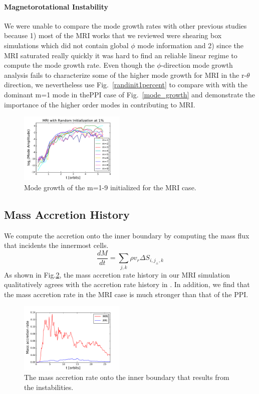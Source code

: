 \documentclass[iop,revtex4]{emulateapj}
\begin{document}
\paragraph*{\rm{\textbf{Magnetorotational Instability}\\}}
We were unable to compare the mode growth rates with other previous studies because 1) most of the \ac{MRI} works that we reviewed were shearing box simulations which did not contain global $\phi$ mode information and 2) since the \ac{MRI} saturated really quickly it was hard to find an reliable linear regime to compute the mode growth rate. Even though the $\phi$-direction mode growth analysis fails to characterize some of the higher mode growth for \ac{MRI} in the r-$\theta$ direction, we nevertheless use Fig.~\ref{randinit1percent} to compare with with the dominant m=1 mode in the\ac{PPI} case of  Fig.~\ref{mode_growth} and demonstrate the importance of the higher order modes in contributing to \ac{MRI}. 
\begin{figure}[ht]
\includegraphics[width=0.45\textwidth,bb=0 0 30 30]{plots/mri_randinit1percent_all_m.pdf}
\caption{Mode growth of the m=1-9 initialized for the \ac{MRI} case.}
\label{mode_growth_mri}
\end{figure}
\subsection{Mass Accretion History}
We compute the accretion onto the inner boundary by computing the mass flux that incidents the innermost cells.
\begin{equation}
\frac{dM}{dt}=\sum_{j,k} \rho v_r \Delta S_{i,j_{\pm},k}
\end{equation}
As shown in Fig.\ref{mass_accretion}, the mass accretion rate history in our \ac{MRI} simulation qualitatively agrees with the accretion rate history in \cite{Jiang:2014A}. In addition, we find that the mass accretion rate in the \ac{MRI} case is much stronger than that of the \ac{PPI}.
\begin{figure}[h]
\includegraphics[width=0.45\textwidth,bb=0 0 30 30]{plots/mass_accretion.pdf}
\caption{The mass accretion rate onto the inner boundary that results from the instabilities.}
\label{mass_accretion}
\end{figure}
\end{document}
